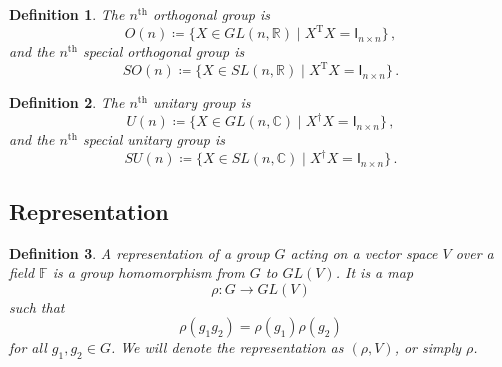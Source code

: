 \documentclass{article}
\theoremstyle{plain}\theoremheaderfont{\normalfont\itshape}\theorembodyfont{\rmfamily}\theoremseparator{.}\newtheorem*{rem}{Remark}\newtheorem*{ex}{Example}\newtheorem*{proof}{Proof}\newtheorem*{altp}{Alternative proof}
\theoremstyle{plain}\theoremheaderfont{\normalfont\bfseries}\theorembodyfont{\rmfamily}\theoremseparator{.}\newtheorem{thm}{Theorem}[section]\newtheorem{lem}[thm]{Lemma}\newtheorem{prop}[thm]{Proposition}\newtheorem*{cor}{Corollary}\newtheorem{defn}[thm]{Definition}\newtheorem{clm}[thm]{Claim}\newtheorem{clminproof}{Claim}
\theoremstyle{break}\theoremheaderfont{\normalfont\itshape}\theorembodyfont{\rmfamily}\theoremseparator{.\medskip}\newtheorem*{proofskip}{Proof}\newtheorem*{exs}{Examples}\newtheorem*{rems}{Remarks}
\theoremstyle{break}\theoremheaderfont{\normalfont\bfseries}\theorembodyfont{\rmfamily}\theoremseparator{.\medskip}\newtheorem{lemskip}[thm]{Lemma}\newtheorem{defnskip}[thm]{Definition}\newtheorem{propskip}[thm]{Proposition}\newtheorem{thmskip}[thm]{Theorem}
\numberwithin{equation}{section}
\newcommand{\tp}{^\mathrm{T}}
\begin{document}
	\begin{defn}
		The \textit{\(n^\text{th}\) orthogonal group} is
		\[O(n)\coloneqq\{X\in GL(n,\mathbb{R})\mid X\tp X=\mathsf{I}_{n\times n}\}\,,\]
		and the \textit{\(n^\text{th}\) special orthogonal group} is
		\[SO(n)\coloneqq\{X\in SL(n,\mathbb{R})\mid X\tp X=\mathsf{I}_{n\times n}\}\,.\]
	\end{defn}
	\begin{defn}
		The \textit{\(n^\text{th}\) unitary group} is
		\[U(n)\coloneqq\{X\in GL(n,\mathbb{C})\mid X^\dagger X=\mathsf{I}_{n\times n}\}\,,\]
		and the \textit{\(n^\text{th}\) special unitary group} is
		\[SU(n)\coloneqq\{X\in SL(n,\mathbb{C})\mid X^\dagger X=\mathsf{I}_{n\times n}\}\,.\]
	\end{defn}
	
	\subsection{Representation}
	\begin{defn}
		A \textit{representation} of a group \(G\) acting on a vector space \(V\) over a field \(\mathbb{F}\) is a group homomorphism from \(G\) to \(GL(V)\). It is a map
		\[\rho: G\to GL(V)\]
		such that
		\[\rho(g_1g_2)=\rho(g_1)\rho(g_2)\]
		for all \(g_1,g_2\in G\). We will denote the representation as \((\rho,V)\), or simply \(\rho\).
	\end{defn}
\end{document}
